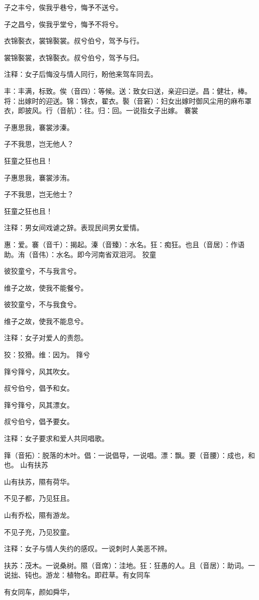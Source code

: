 \documentclass[12pt,UTF8]{ctexbook}
\begin{document}
子之丰兮，俟我乎巷兮，悔予不送兮。

子之昌兮，俟我乎堂兮，悔予不将兮。

衣锦褧衣，裳锦褧裳。叔兮伯兮，驾予与行。

裳锦褧裳，衣锦褧衣。叔兮伯兮，驾予与归。

注释：女子后悔没与情人同行，盼他来驾车同去。

丰：丰满，标致。俟（音四）：等候。送：致女曰送，亲迎曰逆。昌：健壮，棒。将：出嫁时的迎送。锦：锦衣，翟衣。褧（音窘）：妇女出嫁时御风尘用的麻布罩衣，即披风。行（音航）：往。归：回。一说指女子出嫁。 褰裳

子惠思我，褰裳涉溱。

子不我思，岂无他人？

狂童之狂也且！

子惠思我，褰裳涉洧。

子不我思，岂无他士？

狂童之狂也且！

注释：男女间戏谑之辞。表现民间男女爱情。

惠：爱。褰（音千）：揭起。溱（音臻）：水名。狂：痴狂。也且（音居）：作语助。洧（音伟）：水名。即今河南省双泪河。 狡童

彼狡童兮，不与我言兮。

维子之故，使我不能餐兮。

彼狡童兮，不与我食兮。

维子之故，使我不能息兮。

注释：女子对爱人的责怨。

狡：狡猾。维：因为。 箨兮

箨兮箨兮，风其吹女。

叔兮伯兮，倡予和女。

箨兮箨兮，风其漂女。

叔兮伯兮，倡予要女。

注释：女子要求和爱人共同唱歌。

箨（音拓）：脱落的木叶。倡：一说倡导，一说唱。漂：飘。要（音腰）：成也，和也。 山有扶苏

山有扶苏，隰有荷华。

不见子都，乃见狂且。

山有乔松，隰有游龙。

不见子充，乃见狡童。

注释：女子与情人失约的感叹。一说刺时人美恶不辨。

扶苏：茂木。一说桑树。隰（音席）：洼地。狂：狂愚的人。且（音居）：助词。一说拙、钝也。游龙：植物名。即荭草。有女同车

有女同车，颜如舜华，
\end{document}
